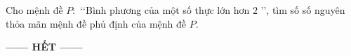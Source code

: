 \documentclass[12pt,a4paper,openany,oneside]{book}
\newcommand{\hetDe}[1]{\par\bigskip\begin{center}{\bfseries ------ HẾT ------}\end{center}\label{cuoide#1}}
\begin{document}
\begin{bt}%
	Cho mệnh đề $P\colon$ \lq\lq Bình phương của một số thực lớn hơn $ 2 $ \rq\rq, tìm số số  nguyên thỏa mãn mệnh đề phủ định của mệnh đề $P$.
\end{bt}


\hetDe{101}
\end{document}
